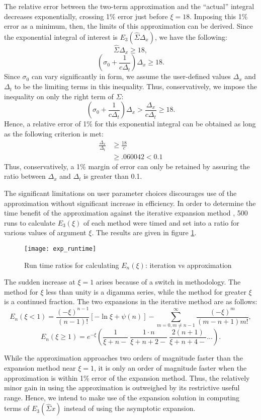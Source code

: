 The relative error between the two-term
approximation and the ``actual'' integral decreases exponentially, crossing 1\%
error just before $\xi=18$.  Imposing this 1\% error as a minimum, then, the
limits of this approximation can be derived.  Since the exponential
integral of interest is $E_3(\hat\Sigma\Delta_x)$, we have the following:
\[\hat\Sigma\Delta_x \geq 18, \]
\[\left(\sigma_0 + \frac{1}{c\Delta_t}\right)\Delta_x\geq 18. \]
Since $\sigma_0$ can vary significantly in form, we assume the user-defined
values $\Delta_x$ and $\Delta_t$ to be the limiting terms in this inequality. 
Thus, conservatively, we impose the inequality on only the right term of
$\hat\Sigma$:
\[(\sigma_0 + \frac{1}{c\Delta_t})\Delta_x>\frac{\Delta_x}{c\Delta_t}\geq 18.\]
Hence, a relative error of 1\% for this exponential integral can be obtained as
long as the following criterion is met:
\begin{align}
\frac{\Delta_x}{\Delta_t}&\geq \frac{18}{c} \nonumber \\
&\geq .060042 < 0.1
\end{align}
Thus, conservatively, a 1\% margin of error can only be retained by assuring the
ratio between $\Delta_x$ and $\Delta_t$ is greater than 0.1.

The significant limitations on user parameter choices discourages use of the
approximation without significant increase in efficiency.  In order to
determine the time benefit of the approximation \cite{wolframEn} against
the iterative expansion method \cite{numRec}, 500 runs to calculate $E_3(\xi)$
of each method were timed and set into a ratio for various values of argument
$\xi$.  The results are given in figure \ref{runtime}.
\begin{figure}[htb]
\centering
\texttt{[image: exp\_runtime]}
\caption{Run time ratios for calculating $E_n(\xi)$: iteration vs approximation}
\label{runtime}
\end{figure}

The sudden increase at $\xi=1$ arises because of a switch in methodology. The
method for $\xi$ less than unity is a digamma series, while the 
method for greater $\xi$ is a continued fraction.  The two expansions in the
iterative method are as follows:
\[E_n(\xi<1)= \frac{(-\xi)^{n-1}}{(n-1)!}[-\ln \xi+\psi(n)]
    -\sum_{m=0,m\neq n-1}^\infty\frac{(-\xi)^m}{(m-n+1)m!},\]
\[E_n(\xi\geq1)=e^{-\xi}\left(\frac{1}{\xi+n-}\ \frac{1\cdot n}{\xi+n+2-}
    \ \frac{2(n+1)}{\xi+n+4-}...\right). \]

While the approximation approaches two orders of magnitude
faster than the expansion method near $\xi=1$, it is only an order of magnitude
faster when the
approximation is within 1\% error of the expansion method. 
Thus, the relatively minor gain in using the approximation is outweighed by its
restrictive useful range.  Hence, we intend to make use of the expansion
solution in computing terms of $E_3(\hat\Sigma x)$ instead of using the
asymptotic expansion.

